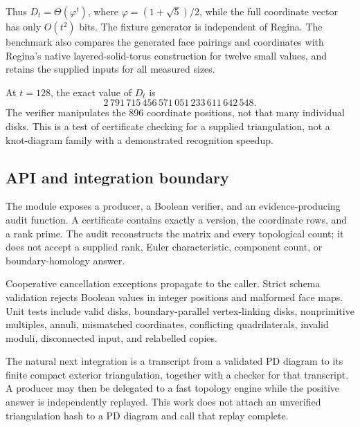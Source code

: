 Thus $D_t=\Theta(\varphi^t)$, where
$\varphi=(1+\sqrt5)/2$, while the full coordinate vector has only $O(t^2)$
bits. The fixture generator is independent of Regina. The benchmark also
compares the generated face pairings and coordinates with Regina's native
layered-solid-torus construction for twelve small values, and retains
the supplied inputs for all measured sizes.

At $t=128$, the exact value of $D_t$ is
\[
 2\,791\,715\,456\,571\,051\,233\,611\,642\,548.
\]
The verifier manipulates the 896 coordinate positions, not that many
individual disks. This is a test of certificate checking for a supplied
triangulation, not a knot-diagram family with a demonstrated recognition
speedup.

\subsection{API and integration boundary}

The module  exposes a
producer, a Boolean verifier, and an evidence-producing audit function.
A certificate contains exactly a version, the coordinate rows, and a rank
prime. The audit reconstructs the matrix and every topological count; it
does not accept a supplied rank, Euler characteristic, component count,
or boundary-homology answer.

Cooperative cancellation exceptions propagate to the caller. Strict schema
validation rejects Boolean values in integer positions and malformed face
maps. Unit tests include valid disks, boundary-parallel vertex-linking
disks, nonprimitive multiples, annuli, mismatched coordinates, conflicting
quadrilaterals, invalid moduli, disconnected input, and relabelled copies.

The natural next integration is a transcript from a validated PD diagram
to its finite compact exterior triangulation, together with a checker for
that transcript. A producer may then be delegated to a fast topology
engine while the positive answer is independently replayed. This work
does not attach an unverified triangulation hash to a PD diagram and call
that replay complete.
